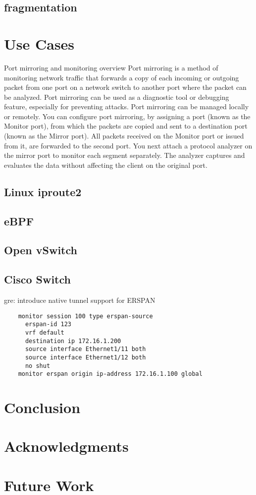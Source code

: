 \documentclass{sigplanconf}
\begin{document}

\subsection{fragmentation}
\section{Use Cases}
Port mirroring and monitoring overview
Port mirroring is a method of monitoring network traffic that forwards a copy of each incoming or outgoing packet from one port on a network switch to another port where the packet can be analyzed. Port mirroring can be used as a diagnostic tool or debugging feature, especially for preventing attacks. Port mirroring can be managed locally or remotely.
You can configure port mirroring, by assigning a port (known as the Monitor port), from which the packets are copied and sent to a destination port (known as the Mirror port). All packets received on the Monitor port or issued from it, are forwarded to the second port. You next attach a protocol analyzer on the mirror port to monitor each segment separately. The analyzer captures and evaluates the data without affecting the client on the original port.

\subsection{Linux iproute2}\label{iproute2}
\subsection{eBPF}\label{ebpf}
\subsection{Open vSwitch}\label{ovs}
\subsection{Cisco Switch}
    gre: introduce native tunnel support for ERSPAN

\begin{verbatim}
    monitor session 100 type erspan-source
      erspan-id 123
      vrf default
      destination ip 172.16.1.200
      source interface Ethernet1/11 both
      source interface Ethernet1/12 both
      no shut
    monitor erspan origin ip-address 172.16.1.100 global
\end{verbatim}

\section{Conclusion}
\section{Acknowledgments}
\section{Future Work}
\end{document}
